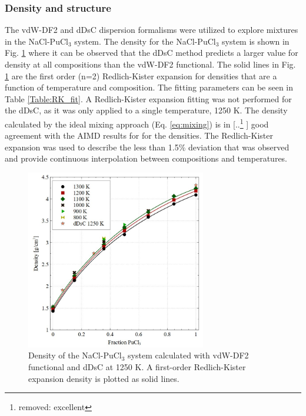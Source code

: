 \documentclass[review]{elsarticle}
\providecommand{\DIFaddtex}[1]{{\protect\color{blue} \sf #1}} %
\providecommand{\DIFdeltex}[1]{{\protect\color{red} [..\footnote{removed: #1} ]}} %
\providecommand{\DIFaddbegin}{} %
\providecommand{\DIFaddend}{} %
\providecommand{\DIFdelbegin}{} %
\providecommand{\DIFdelend}{} %
\providecommand{\DIFaddbeginFL}{} %
\providecommand{\DIFaddendFL}{} %
\providecommand{\DIFdelbeginFL}{} %
\providecommand{\DIFdelendFL}{} %
\providecommand{\DIFadd}[1]{\texorpdfstring{\DIFaddtex{#1}}{#1}} %
\providecommand{\DIFdel}[1]{\texorpdfstring{\DIFdeltex{#1}}{}} %
\newcommand{\DIFscaledelfig}{0.5}
\newlength{\DIFdelgraphicswidth} %
\newlength{\DIFdelgraphicsheight} %
\newcommand{\DIFaddincludegraphics}[2][]{{\color{blue}\fbox{\DIFOincludegraphics[#1]{#2}}}} %
\newcommand{\DIFdelincludegraphics}[2][]{%
\sbox{\DIFdelgraphicsbox}{\DIFOincludegraphics[#1]{#2}}%
\settoboxwidth{\DIFdelgraphicswidth}{\DIFdelgraphicsbox} %
\settoboxtotalheight{\DIFdelgraphicsheight}{\DIFdelgraphicsbox} %
\scalebox{\DIFscaledelfig}{%
\parbox[b]{\DIFdelgraphicswidth}{\usebox{\DIFdelgraphicsbox}\\[-\baselineskip] \rule{\DIFdelgraphicswidth}{0em}}\llap{\resizebox{\DIFdelgraphicswidth}{\DIFdelgraphicsheight}{%
\setlength{\unitlength}{\DIFdelgraphicswidth}%
\begin{picture}(1,1)%
\thicklines\linethickness{2pt} %
{\color[rgb]{1,0,0}\put(0,0){\framebox(1,1){}}}%
{\color[rgb]{1,0,0}\put(0,0){\line( 1,1){1}}}%
{\color[rgb]{1,0,0}\put(0,1){\line(1,-1){1}}}%
\end{picture}%
}\hspace*{3pt}}} %
} %
\DeclareRobustCommand{\DIFaddbegin}{\DIFOaddbegin \let\includegraphics\DIFaddincludegraphics} %
\DeclareRobustCommand{\DIFaddend}{\DIFOaddend \let\includegraphics\DIFOincludegraphics} %
\DeclareRobustCommand{\DIFdelbegin}{\DIFOdelbegin \let\includegraphics\DIFdelincludegraphics} %
\DeclareRobustCommand{\DIFdelend}{\DIFOaddend \let\includegraphics\DIFOincludegraphics} %
\DeclareRobustCommand{\DIFaddbeginFL}{\DIFOaddbeginFL \let\includegraphics\DIFaddincludegraphics} %
\DeclareRobustCommand{\DIFaddendFL}{\DIFOaddendFL \let\includegraphics\DIFOincludegraphics} %
\DeclareRobustCommand{\DIFdelbeginFL}{\DIFOdelbeginFL \let\includegraphics\DIFdelincludegraphics} %
\DeclareRobustCommand{\DIFdelendFL}{\DIFOaddendFL \let\includegraphics\DIFOincludegraphics} %
\begin{document}
\subsubsection{Density and structure}
The vdW-DF2 and dDsC dispersion formalisms were utilized to explore mixtures in the NaCl-PuCl$_3$ system. The density for the NaCl-PuCl$_3$ system is shown in Fig. \ref{fig:density} where it can be observed that the dDsC method predicts a larger value for density at all compositions than the vdW-DF2 functional. The solid lines in Fig. \ref{fig:density} are the first order (n=2) Redlich-Kister expansion for densities that are a function of temperature and composition. The fitting parameters can be seen in Table \ref{Table:RK_fit}. A Redlich-Kister expansion fitting was not performed for the dDsC, as it was only applied to a single temperature, 1250 K. The density calculated by the ideal mixing approach (Eq. \ref{eq:mixing}) is in \DIFdelbegin \DIFdel{excellent }\DIFdelend \DIFaddbegin \DIFadd{good }\DIFaddend agreement with the AIMD results for for the densities. The Redlich-Kister expansion was used to describe the less than 1.5\% deviation that was observed and provide continuous interpolation between compositions and temperatures.
\begin{figure}[h!]
 \centering
 \DIFdelbeginFL %
\DIFdelendFL \DIFaddbeginFL \includegraphics[width=0.7\textwidth]{density.jpg} 
 \DIFaddendFL \caption{Density of the NaCl-PuCl$_3$ system calculated with vdW-DF2 functional and dDsC at 1250 K. A first-order Redlich-Kister expansion density is plotted as solid lines.}
 \label{fig:density}
\end{figure}
\end{document}
